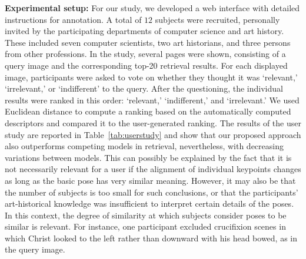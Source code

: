 \documentclass[sigconf]{acmart}
\begin{document}
\textbf{Experimental setup:} For our study, we developed a web interface with detailed instructions for annotation.
A total of $12$ subjects were recruited, personally invited by the participating departments of computer science and art history.
These included seven computer scientists, two art historians, and three persons from other professions. 
In the study, several pages were shown, consisting of a query image and the corresponding top-20 retrieval results. For each displayed image, participants were asked to vote on whether they thought it was \enquote*{relevant,} \enquote*{irrelevant,} or \enquote*{indifferent} to the query. 
After the questioning, the individual results were ranked in this order: \enquote*{relevant,} \enquote*{indifferent,} and \enquote*{irrelevant.}
We used Euclidean distance to compute a ranking based on the automatically computed descriptors and compared it to the user-generated ranking. 
The results of the user study are reported in Table~\ref{tab:userstudy} and show that our proposed approach also outperforms competing models in retrieval, nevertheless, with decreasing variations between models. 
This can possibly be explained by the fact that it is not necessarily relevant for a user if the alignment of individual keypoints changes as long as the basic pose has very similar meaning. 
However, it may also be that the number of subjects is too small for such conclusions, or that the participants' art-historical knowledge was insufficient to interpret certain details of the poses. 
In this context, the degree of similarity at which subjects consider poses to be similar is relevant. For instance, one participant excluded crucifixion scenes in which Christ looked to the left rather than downward with his head bowed, as in the query image. 
\end{document}

